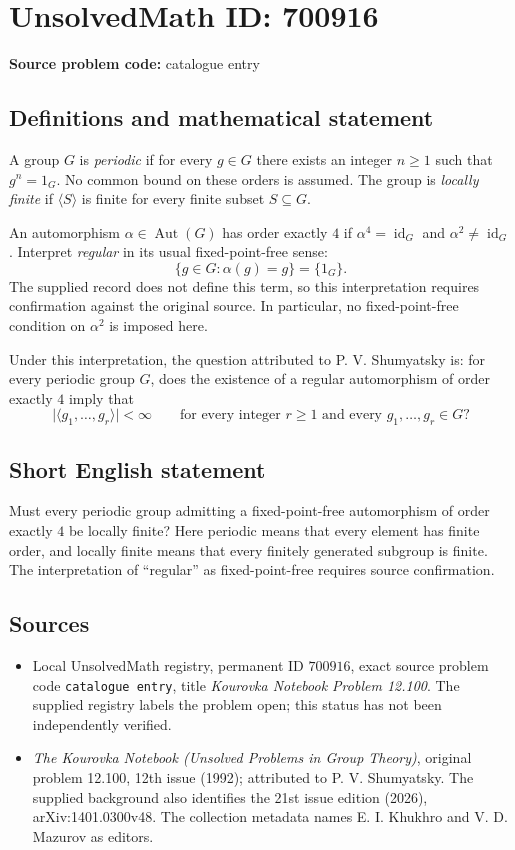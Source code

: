 \documentclass[11pt]{article}
\begin{document}
\section*{UnsolvedMath ID: 700916}
\textbf{Source problem code:} catalogue entry
\subsection{Definitions and mathematical statement}
A group \(G\) is \emph{periodic} if for every \(g\in G\) there exists an integer \(n\geq 1\) such that \(g^n=1_G\). No common bound on these orders is assumed. The group is \emph{locally finite} if \(\langle S\rangle\) is finite for every finite subset \(S\subseteq G\).

An automorphism \(\alpha\in\operatorname{Aut}(G)\) has order exactly \(4\) if \(\alpha^4=\operatorname{id}_G\) and \(\alpha^2\neq\operatorname{id}_G\). Interpret \emph{regular} in its usual fixed-point-free sense:
\[
\{g\in G:\alpha(g)=g\}=\{1_G\}.
\]
The supplied record does not define this term, so this interpretation requires confirmation against the original source. In particular, no fixed-point-free condition on \(\alpha^2\) is imposed here.

Under this interpretation, the question attributed to P. V. Shumyatsky is: for every periodic group \(G\), does the existence of a regular automorphism of order exactly \(4\) imply that
\[
\lvert\langle g_1,\ldots,g_r\rangle\rvert<\infty
\qquad\text{for every integer }r\geq 1\text{ and every }g_1,\ldots,g_r\in G?
\]
\subsection{Short English statement}
Must every periodic group admitting a fixed-point-free automorphism of order exactly \(4\) be locally finite? Here periodic means that every element has finite order, and locally finite means that every finitely generated subgroup is finite. The interpretation of ``regular'' as fixed-point-free requires source confirmation.
\subsection{Sources}
\begin{itemize}
\item Local UnsolvedMath registry, permanent ID \(700916\), exact source problem code \texttt{catalogue entry}, title \emph{Kourovka Notebook Problem 12.100}. The supplied registry labels the problem open; this status has not been independently verified.
\item \emph{The Kourovka Notebook (Unsolved Problems in Group Theory)}, original problem 12.100, 12th issue (1992); attributed to P. V. Shumyatsky. The supplied background also identifies the 21st issue edition (2026), arXiv:1401.0300v48. The collection metadata names E. I. Khukhro and V. D. Mazurov as editors.
\end{itemize}
\end{document}
